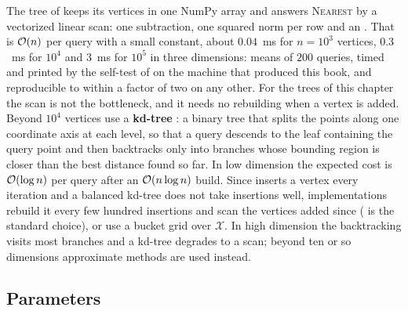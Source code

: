 The tree of  keeps its vertices in one NumPy array and
answers \textsc{Nearest} by a vectorized linear scan: one subtraction, one
squared norm per row and an . That is $\mathcal{O}\!\left(n\right)$ per query with
a small constant, about $0.04$~ms for $n=10^{3}$ vertices, $0.3$~ms for
$10^{4}$ and $3$~ms for $10^{5}$ in three dimensions: means of $200$ queries,
timed and printed by the self-test of  on the machine
that produced this book, and reproducible to within a factor of two on any
other. For the trees of this chapter the scan is not the bottleneck, and it
needs no rebuilding when a vertex is added. Beyond $10^{4}$ vertices use a
\textbf{kd-tree} \cite{bentley1975kdtree}: a
binary tree that splits the points along one coordinate axis at each level,
so that a query descends to the leaf containing the query point and then
backtracks only into branches whose bounding region is closer than the best
distance found so far. In low dimension the expected cost is $\mathcal{O}\!\left(\log n\right)$
per query after an $\mathcal{O}\!\left(n\log n\right)$ build. Since \rrt inserts a vertex every
iteration and a balanced kd-tree does not take insertions well,
implementations rebuild it every few hundred insertions and scan the
vertices added since ( is the standard \python
choice), or use a bucket grid over $\mathcal{X}$. In high dimension the
backtracking visits most branches and a kd-tree degrades to a scan; beyond
ten or so dimensions approximate methods are used instead.

\subsection{Parameters}
\label{sec:ch16-parameters}

